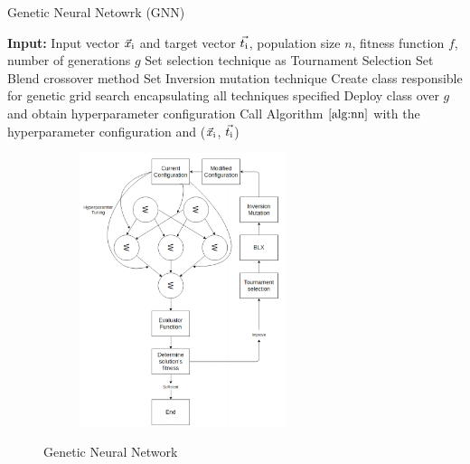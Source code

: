 \documentclass[conference]{IEEEtran}
\begin{document}
\begin{algorithm}[t]
\scriptsize
\caption{Genetic Neural Netowrk (GNN)}
\label{alg:gnn}
\begin{algorithmic}[1]
\STATE \textbf{Input:} Input vector $\vec{x}\textsubscript{i}$ and target vector $\vec{t\textsubscript{i}}$, population size $\textit{n}$, fitness function $\textit{f}$, number of generations $\textit{g}$
\STATE Set selection technique as Tournament Selection
\STATE Set Blend crossover method 
\STATE Set Inversion mutation technique
\ENDFOR
\STATE Create class responsible for genetic grid search encapsulating all techniques specified
\STATE Deploy class over $\textit{g}$ and obtain hyperparameter configuration   
\STATE Call Algorithm $\ref{alg:nn}$ with the hyperparameter configuration and ($\vec{x}\textsubscript{i}$, $\vec{t\textsubscript{i}}$)
\end{algorithmic}
\end{algorithm}

\begin{figure}
\centering
\begin{subfigure}{5cm}
\centering\includegraphics[height=8cm]{nn.png}
\end{subfigure}%
\caption{Genetic Neural Network}
\label{fgn}
\end{figure}
\end{document}
